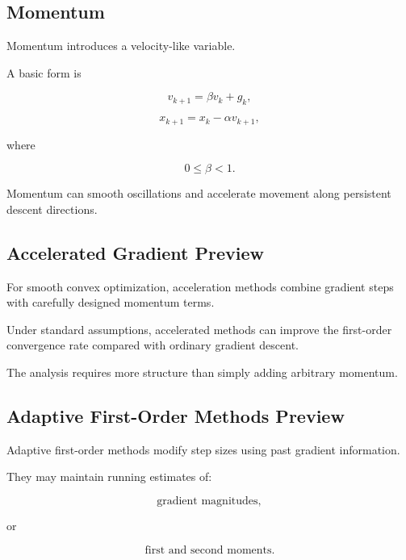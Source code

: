 \subsection{Momentum}
\label{subsec:optimization-momentum}

Momentum introduces a velocity-like variable.

A basic form is

\[
\boxed{
v_{k+1}
=
\beta v_k
+
g_k,
}
\]

\[
\boxed{
x_{k+1}
=
x_k
-
\alpha v_{k+1},
}
\]

where

\[
0\leq\beta<1.
\]

Momentum can smooth oscillations and accelerate movement along persistent
descent directions.

\subsection{Accelerated Gradient Preview}
\label{subsec:accelerated-gradient-preview}

For smooth convex optimization, acceleration methods combine gradient
steps with carefully designed momentum terms.

Under standard assumptions, accelerated methods can improve the
first-order convergence rate compared with ordinary gradient descent.

The analysis requires more structure than simply adding arbitrary
momentum.

\subsection{Adaptive First-Order Methods Preview}
\label{subsec:adaptive-first-order-preview}

Adaptive first-order methods modify step sizes using past gradient
information.

They may maintain running estimates of:

\[
\boxed{
\text{gradient magnitudes},
}
\]

or

\[
\boxed{
\text{first and second moments}.
}
\]

